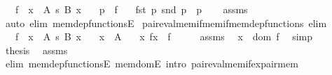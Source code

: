 \begin{isabellebody}
\ \ \ {\isachardoublequoteopen}f\ {\isasymin}\ {\isacharparenleft}{\kern0pt}x\ {\isasymin}\ A{\isacharparenright}{\kern0pt}\ {\isasymrightarrow}s\ {\isacharparenleft}{\kern0pt}B\ x{\isacharparenright}{\kern0pt}{\isachardoublequoteclose}\isanewline
\ \ \ {\isachardoublequoteopen}p\ {\isasymin}\ f{\isachardoublequoteclose}\isanewline
\ \ \ {\isachardoublequoteopen}{\isasymlangle}fst\ p{\isacharcomma}{\kern0pt}\ snd\ p{\isasymrangle}\ {\isacharequal}{\kern0pt}\ p{\isachardoublequoteclose}\isanewline
%
\isadelimproof
\ \ %
\endisadelimproof
%
\isatagproof
{}\isamarkupfalse%
\ assms\ \isamarkupfalse%
\ {\isacharparenleft}{\kern0pt}auto\ elim{\isacharbang}{\kern0pt}{\isacharcolon}{\kern0pt}\ mem{\isacharunderscore}{\kern0pt}dep{\isacharunderscore}{\kern0pt}functionsE{\isacharparenright}{\kern0pt}%
\endisatagproof
{\isafoldproof}%
%
\isadelimproof
\isanewline
%
\endisadelimproof
\isanewline
{}\isamarkupfalse%
\ pair{\isacharunderscore}{\kern0pt}eval{\isacharunderscore}{\kern0pt}mem{\isacharunderscore}{\kern0pt}if{\isacharunderscore}{\kern0pt}mem{\isacharunderscore}{\kern0pt}if{\isacharunderscore}{\kern0pt}mem{\isacharunderscore}{\kern0pt}dep{\isacharunderscore}{\kern0pt}functions\ {\isacharbrackleft}{\kern0pt}elim{\isacharbrackright}{\kern0pt}{\isacharcolon}{\kern0pt}\isanewline
\ \ \ {\isachardoublequoteopen}f\ {\isasymin}\ {\isacharparenleft}{\kern0pt}x\ {\isasymin}\ A{\isacharparenright}{\kern0pt}\ {\isasymrightarrow}s\ {\isacharparenleft}{\kern0pt}B\ x{\isacharparenright}{\kern0pt}{\isachardoublequoteclose}\isanewline
\ \ \ {\isachardoublequoteopen}x\ {\isasymin}\ A{\isachardoublequoteclose}\isanewline
\ \ \ {\isachardoublequoteopen}{\isasymlangle}x{\isacharcomma}{\kern0pt}\ f{\isacharbackquote}{\kern0pt}x{\isasymrangle}\ {\isasymin}\ f{\isachardoublequoteclose}\isanewline
%
\isadelimproof
%
\endisadelimproof
%
\isatagproof
{}\isamarkupfalse%
\ {\isacharminus}{\kern0pt}\isanewline
\ \ \isamarkupfalse%
\ assms\ \isamarkupfalse%
\ {\isachardoublequoteopen}x\ {\isasymin}\ dom\ f{\isachardoublequoteclose}\ \isamarkupfalse%
\ simp\isanewline
\ \ \isamarkupfalse%
\ \isamarkupfalse%
\ {\isacharquery}{\kern0pt}thesis\ \isamarkupfalse%
\ assms\isanewline
\ \ \ \ \isamarkupfalse%
\ {\isacharparenleft}{\kern0pt}elim\ mem{\isacharunderscore}{\kern0pt}dep{\isacharunderscore}{\kern0pt}functionsE\ mem{\isacharunderscore}{\kern0pt}domE{\isacharcomma}{\kern0pt}\ intro\ pair{\isacharunderscore}{\kern0pt}eval{\isacharunderscore}{\kern0pt}mem{\isacharunderscore}{\kern0pt}if{\isacharunderscore}{\kern0pt}ex{}{\isacharunderscore}{\kern0pt}pair{\isacharunderscore}{\kern0pt}mem{\isacharparenright}{\kern0pt}\isanewline

\end{isabellebody}
